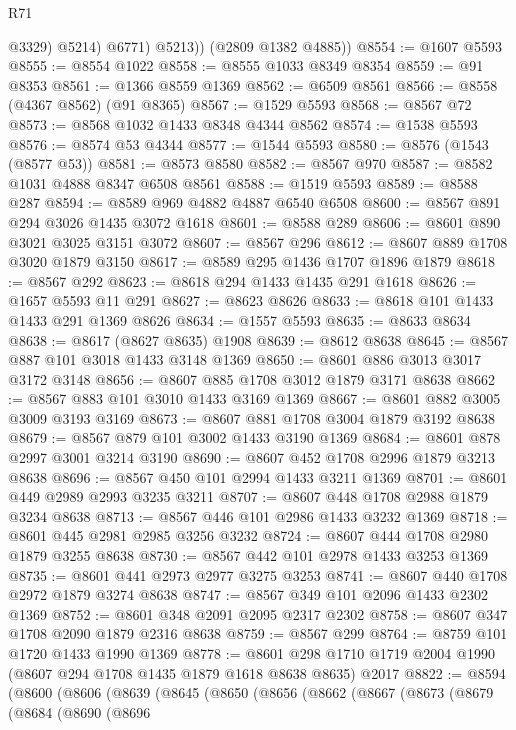 \begin{lexlean}{R71}
\begin{coremodule}
                @3329)
              @5214)
            @6771)
          @5213))
      (@2809 @1382 @4885))
@8554 := @1607 @5593
@8555 := @8554 @1022
@8558 := @8555 @1033 @8349 @8354
@8559 := @91 @8353
@8561 := @1366 @8559 @1369
@8562 := @6509 @8561
@8566 := @8558 (@4367 @8562) (@91 @8365)
@8567 := @1529 @5593
@8568 := @8567 @72
@8573 := @8568 @1032 @1433 @8348 @4344 @8562
@8574 := @1538 @5593
@8576 := @8574 @53 @4344
@8577 := @1544 @5593
@8580 := @8576 (@1543 (@8577 @53))
@8581 := @8573 @8580
@8582 := @8567 @970
@8587 := @8582 @1031 @4888 @8347 @6508 @8561
@8588 := @1519 @5593
@8589 := @8588 @287
@8594 := @8589 @969 @4882 @4887 @6540 @6508
@8600 := @8567 @891 @294 @3026 @1435 @3072 @1618
@8601 := @8588 @289
@8606 := @8601 @890 @3021 @3025 @3151 @3072
@8607 := @8567 @296
@8612 := @8607 @889 @1708 @3020 @1879 @3150
@8617 := @8589 @295 @1436 @1707 @1896 @1879
@8618 := @8567 @292
@8623 := @8618 @294 @1433 @1435 @291 @1618
@8626 := @1657 @5593 @11 @291
@8627 := @8623 @8626
@8633 := @8618 @101 @1433 @1433 @291 @1369 @8626
@8634 := @1557 @5593
@8635 := @8633 @8634
@8638 := @8617 (@8627 @8635) @1908
@8639 := @8612 @8638
@8645 := @8567 @887 @101 @3018 @1433 @3148 @1369
@8650 := @8601 @886 @3013 @3017 @3172 @3148
@8656 := @8607 @885 @1708 @3012 @1879 @3171 @8638
@8662 := @8567 @883 @101 @3010 @1433 @3169 @1369
@8667 := @8601 @882 @3005 @3009 @3193 @3169
@8673 := @8607 @881 @1708 @3004 @1879 @3192 @8638
@8679 := @8567 @879 @101 @3002 @1433 @3190 @1369
@8684 := @8601 @878 @2997 @3001 @3214 @3190
@8690 := @8607 @452 @1708 @2996 @1879 @3213 @8638
@8696 := @8567 @450 @101 @2994 @1433 @3211 @1369
@8701 := @8601 @449 @2989 @2993 @3235 @3211
@8707 := @8607 @448 @1708 @2988 @1879 @3234 @8638
@8713 := @8567 @446 @101 @2986 @1433 @3232 @1369
@8718 := @8601 @445 @2981 @2985 @3256 @3232
@8724 := @8607 @444 @1708 @2980 @1879 @3255 @8638
@8730 := @8567 @442 @101 @2978 @1433 @3253 @1369
@8735 := @8601 @441 @2973 @2977 @3275 @3253
@8741 := @8607 @440 @1708 @2972 @1879 @3274 @8638
@8747 := @8567 @349 @101 @2096 @1433 @2302 @1369
@8752 := @8601 @348 @2091 @2095 @2317 @2302
@8758 := @8607 @347 @1708 @2090 @1879 @2316 @8638
@8759 := @8567 @299
@8764 := @8759 @101 @1720 @1433 @1990 @1369
@8778 := @8601 @298 @1710 @1719 @2004 @1990 (@8607 @294 @1708 @1435 @1879 @1618 @8638 @8635) @2017
@8822 := @8594
    (@8600
      (@8606
        (@8639
          (@8645
            (@8650
              (@8656
                (@8662
                  (@8667
                    (@8673
                      (@8679
                        (@8684
                          (@8690
                            (@8696

\end{coremodule}
\end{lexlean}

